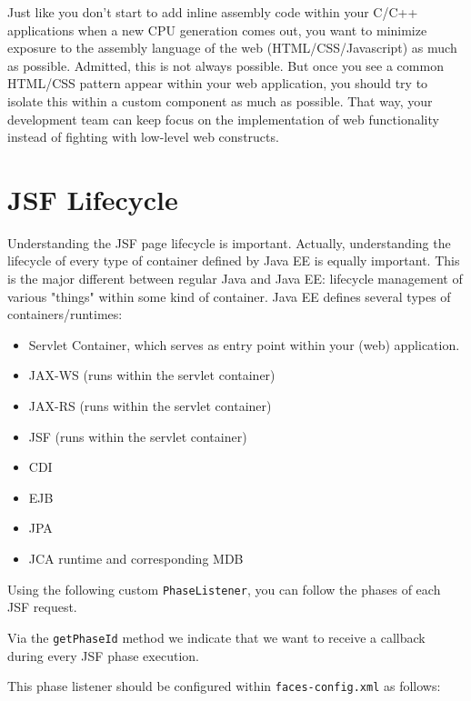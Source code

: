 Just like you don't start to add inline assembly code within your C/C++ applications when a new CPU generation comes out,
you want to minimize exposure to the assembly language of the web (HTML/CSS/Javascript) as much as possible.
Admitted, this is not always possible.
But once you see a common HTML/CSS pattern appear within your web application,
you should try to isolate this within a custom component as much as possible.
That way, your development team can keep focus on the implementation of web functionality instead of fighting with low-level web constructs.

\section{JSF Lifecycle}
Understanding the JSF page lifecycle is important.
Actually, understanding the lifecycle of every type of container defined by Java EE is equally important.
This is the major different between regular Java and Java EE: lifecycle management of various "things" within some kind of container.
Java EE defines several types of containers/runtimes:
\begin{itemize}
	\item Servlet Container, which serves as entry point within your (web) application.
	\item JAX-WS (runs within the servlet container)
	\item JAX-RS (runs within the servlet container)
	\item JSF (runs within the servlet container)
	\item CDI
	\item EJB
	\item JPA
	\item JCA runtime and corresponding MDB
\end{itemize}

Using the following custom \texttt{PhaseListener}, you can follow the phases of each JSF request.

Via the \texttt{getPhaseId} method we indicate that we want to receive a callback during every JSF phase execution.

This phase listener should be configured within \texttt{faces-config.xml} as follows:


